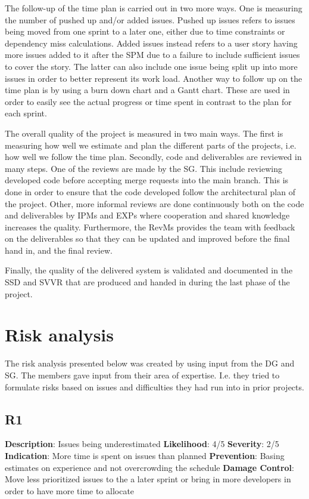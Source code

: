 \documentclass{article}
\begin{document}
The follow-up of the time plan is carried out in two more ways. One is measuring the number of pushed up and/or added issues. Pushed up issues refers to issues being moved from one sprint to a later one, either due to time constraints or dependency miss calculations. Added issues instead refers to a user story having more issues added to it after the SPM due to a failure to include sufficient issues to cover the story. The latter can also include one issue being split up into more issues in order to better represent its work load.
Another way to follow up on the time plan is by using a burn down chart and a Gantt chart. These are used in order to easily see the actual progress or time spent in contrast to the plan for each sprint. 

The overall quality of the project is measured in two main ways. The first is measuring how well we estimate and plan the different parts of the projects, i.e. how well we follow the time plan. Secondly, code and deliverables are reviewed in many steps. One of the reviews are made by the SG. This include reviewing developed code before accepting merge requests into the main branch. This is done in order to ensure that the code developed follow the architectural plan of the project. Other, more informal reviews are done continuously both on the code and deliverables by IPMs and EXPs where cooperation and shared knowledge increases the quality. Furthermore, the RevMs provides the team with feedback on the deliverables so that they can be updated and improved before the final hand in, and the final review. 

Finally, the quality of the delivered system is validated and documented in the SSD and SVVR that are produced and handed in during the last phase of the project.

\section{Risk analysis}
The risk analysis presented below was created by using input from the DG and SG. The members gave input from their area of expertise. I.e. they tried to formulate risks based on issues and difficulties they had run into in prior projects. 

\subsection{R1}
\textbf{Description}: Issues being underestimated \newline
\textbf{Likelihood}: 4/5\newline
\textbf{Severity}: 2/5\newline
\textbf{Indication}: More time is spent on issues than planned \newline
\textbf{Prevention}: Basing estimates on experience and not overcrowding the schedule  \newline
\textbf{Damage Control}: Move less prioritized issues to the a later sprint or bring in more developers in order to have more time to allocate \newline
\end{document}
